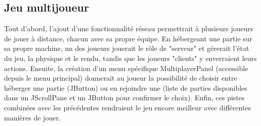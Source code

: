 \documentclass[a4paper, 12pt]{article}
\begin{document}
        \subsection{Jeu multijoueur}
            Tout d'abord, l'ajout d'une fonctionnalité réseau permettrait à plusieurs joueurs de jouer à distance, chacun avec sa propre équipe.
            En hébergeant une partie sur sa propre machine, un des joueurs jouerait le rôle de "serveur" et gérerait l'état du jeu, la physique et le rendu, tandis que les joueurs "clients" y enverraient leurs actions.
            Ensuite, la création d'un menu spécifique MultiplayerPanel (accessible depuis le menu principal) donnerait au joueur la possibilité de choisir entre héberger une partie (JButton) ou en rejoindre une (liste de parties disponibles dans un JScrollPane et un JButton pour confirmer le choix).
            Enfin, ces pistes combinées avec les précédentes rendraient le jeu encore meilleur avec différentes manières de jouer.
\end{document}
